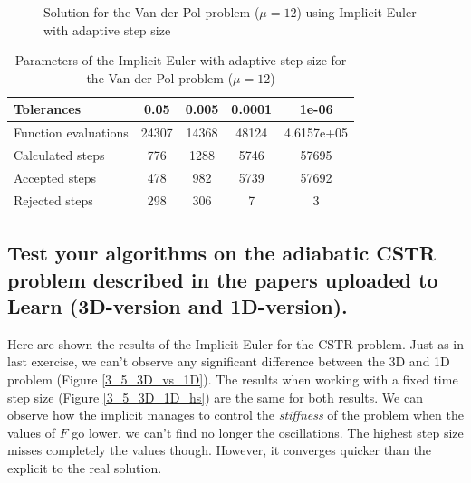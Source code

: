 \begin{figure}[H]
    \centering
    \caption{Solution for the Van der Pol problem ($\mathit{\mu = 12}$) using Implicit Euler with adaptive step size}
    \label{3_4_adaptive_mu_12}
\end{figure}

\begin{table}[H]
    \centering
    \begin{tabular}{@{}l|cccc@{}}    \toprule
    Tolerances           & 0.05  & 0.005 & 0.0001 & 1e-06      \\ \midrule
    Function evaluations & 24307 & 14368 & 48124  & 4.6157e+05 \\
    Calculated steps     & 776   & 1288  & 5746   & 57695      \\
    Accepted steps       & 478   & 982   & 5739   & 57692      \\
    Rejected steps       & 298   & 306   & 7      & 3          \\ \bottomrule
    \end{tabular}
    \caption{Parameters of the Implicit Euler with adaptive step size for the Van der Pol problem ($\mathit{\mu = 12}$)}
    \label{3_4_adaptive_mu_12_table}
\end{table}

\pagebreak

\subsection{Test  your  algorithms  on  the  adiabatic  CSTR  problem  described  in  the
papers uploaded to Learn (3D-version and 1D-version).}
Here are shown the results of the Implicit Euler for the CSTR problem. Just as in last exercise, we can't observe any significant difference between the 3D and 1D problem (Figure \ref{3_5_3D_vs_1D}). The results when working with a fixed time step size (Figure \ref{3_5_3D_1D_hs}) are the same for both results. We can observe how the implicit manages to control the \textit{stiffness} of the problem when the values of $F$ go lower, we can't find no longer the oscillations. The highest step size misses completely the values though. However, it converges quicker than the explicit to the real solution.

